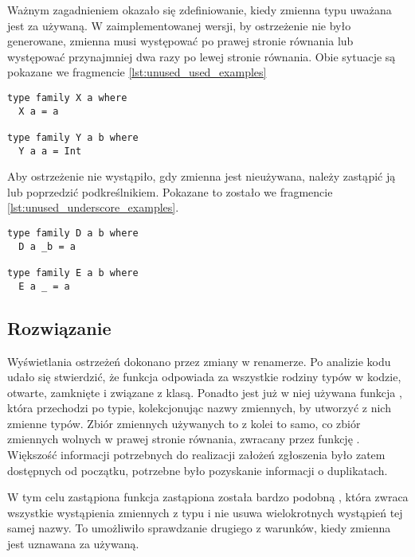 Ważnym zagadnieniem okazało się zdefiniowanie, kiedy zmienna typu uważana jest za używaną. W zaimplementowanej wersji, by ostrzeżenie nie było generowane, zmienna musi występować po prawej stronie równania lub występować przynajmniej dwa razy po lewej stronie równania. Obie sytuacje są pokazane we fragmencie \ref{lst:unused_used_examples}

\begin{lstlisting}[label={lst:unused_used_examples},
                   caption={Przykład funkcji na poziomie typów ze zmiennymi uznawanymi za wykorzystywane.}]
type family X a where
  X a = a

type family Y a b where
  Y a a = Int
\end{lstlisting}

Aby ostrzeżenie nie wystąpiło, gdy zmienna jest nieużywana, należy zastąpić ją lub poprzedzić podkreślnikiem. Pokazane to zostało we fragmencie \ref{lst:unused_underscore_examples}.

\begin{lstlisting}[label={lst:unused_underscore_examples},
                   caption={Przykład funkcji na poziomie typów ze zmiennymi zastąpionymi lub poprzedzonymi podkreślnikami.}]
type family D a b where
  D a _b = a

type family E a b where
  E a _ = a
\end{lstlisting}

\subsection{Rozwiązanie} %

Wyświetlania ostrzeżeń dokonano przez zmiany w renamerze. Po analizie kodu udało się stwierdzić, że funkcja  odpowiada za wszystkie rodziny typów w kodzie, otwarte, zamknięte i związane z klasą. Ponadto jest już w niej używana funkcja , która przechodzi po typie, kolekcjonując nazwy zmiennych, by utworzyć z nich zmienne typów. Zbiór zmiennych używanych to z kolei to samo, co zbiór zmiennych wolnych w prawej stronie równania, zwracany przez funkcję . Większość informacji potrzebnych do realizacji założeń zgłoszenia było zatem dostępnych od początku, potrzebne było pozyskanie informacji o duplikatach.

W tym celu zastąpiona funkcja  zastąpiona została bardzo podobną , która zwraca wszystkie wystąpienia zmiennych z typu i nie usuwa wielokrotnych wystąpień tej samej nazwy. To umożliwiło sprawdzanie drugiego z warunków, kiedy zmienna jest uznawana za używaną.

